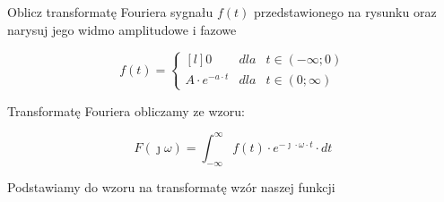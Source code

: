 \begin{task}
Oblicz transformatę Fouriera sygnału $f(t)$ przedstawionego na rysunku oraz narysuj jego widmo amplitudowe i fazowe

\begin{figure}[H]
\centering
{}
\end{figure}

\begin{equation}
f(t) = \left\{\begin{matrix*}[l]
0 & dla & t \in \left(-\infty; 0\right)\\
A \cdot e^{-a\cdot t} & dla & t \in \left(0; \infty\right)
\end{matrix*}\right.
\end{equation}

Transformatę Fouriera obliczamy ze wzoru:

\begin{equation}
F(\jmath \omega )=\int_{-\infty }^{\infty}f(t) \cdot e^{-\jmath \cdot \omega \cdot t}\cdot dt
\end{equation}

Podstawiamy do wzoru na transformatę wzór naszej funkcji


\end{task}
